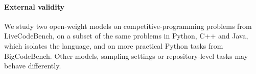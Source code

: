 \paragraph{External validity}
We study two open-weight models on competitive-programming problems from LiveCodeBench, on a subset of the same problems in Python, C++ and Java, which
isolates the language, and on more practical Python tasks from BigCodeBench.
Other models, sampling settings or repository-level tasks may behave differently.